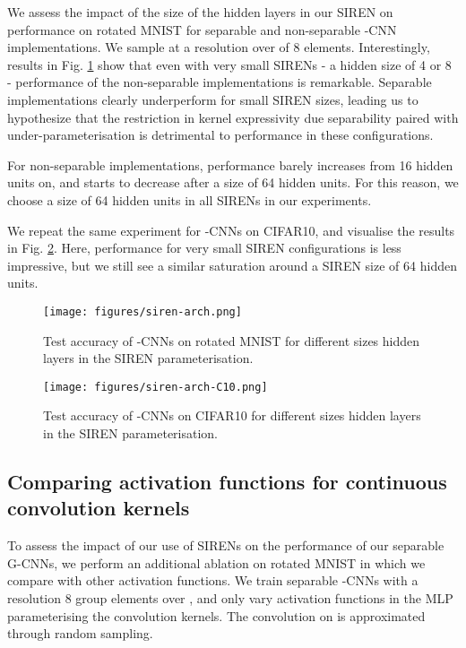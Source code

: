 \documentclass[nohyperref]{article}
\theoremstyle{plain}
\theoremstyle{definition}
\theoremstyle{remark}
\begin{document}
We assess the impact of the size of the hidden layers in our SIREN on performance on rotated MNIST for separable and non-separable -CNN implementations. We sample at a resolution over  of 8 elements. Interestingly, results in Fig. \ref{fig:siren-arch} show that even with very small SIRENs - a hidden size of 4 or 8 - performance of the non-separable implementations is remarkable. Separable implementations clearly underperform for small SIREN sizes, leading us to hypothesize that the restriction in kernel expressivity due separability paired with under-parameterisation is detrimental to performance in these configurations.

For non-separable implementations, performance barely increases from 16 hidden units on, and starts to decrease after a size of 64 hidden units. For this reason, we choose a size of 64 hidden units in all SIRENs in our experiments.

We repeat the same experiment for -CNNs on CIFAR10, and visualise the results in Fig. \ref{fig:siren-arch-c10}. Here, performance for very small SIREN configurations is less impressive, but we still see a similar saturation around a SIREN size of 64 hidden units.

\begin{figure}
\centering
  \texttt{[image: figures/siren-arch.png]}
  \captionsetup{width=.9\linewidth}
  \caption{Test accuracy of -CNNs on rotated MNIST for different sizes hidden layers in the SIREN parameterisation.}
  \label{fig:siren-arch}
\end{figure}
\begin{figure}
\centering
  \texttt{[image: figures/siren-arch-C10.png]}
  \captionsetup{width=.9\linewidth}
  \caption{Test accuracy of -CNNs on CIFAR10 for different sizes hidden layers in the SIREN parameterisation.}
  \label{fig:siren-arch-c10}
\end{figure}


\subsection{Comparing activation functions for continuous convolution kernels} \label{app:activationfunctions}
To assess the impact of our use of SIRENs on the performance of our separable G-CNNs, we perform an additional ablation on rotated MNIST in which we compare with other activation functions. We train separable -CNNs with a resolution 8 group elements over , and only vary activation functions in the MLP parameterising the convolution kernels. The convolution on  is approximated through random sampling.
\end{document}
